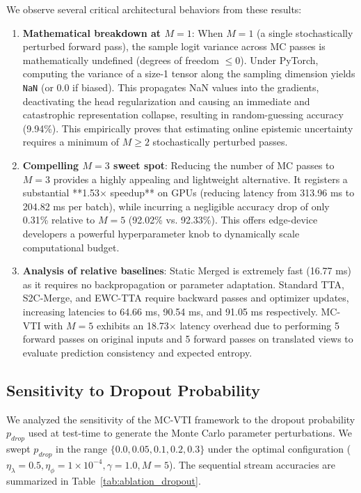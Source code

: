 \documentclass{article}
\theoremstyle{plain}
\theoremstyle{definition}
\theoremstyle{remark}
\begin{document}
We observe several critical architectural behaviors from these results:
\begin{enumerate}
  \item \textbf{Mathematical breakdown at $M=1$}: When $M=1$ (a single stochastically perturbed forward pass), the sample logit variance across MC passes is mathematically undefined (degrees of freedom $\leq 0$). Under PyTorch, computing the variance of a size-1 tensor along the sampling dimension yields \texttt{NaN} (or $0.0$ if biased). This propagates NaN values into the gradients, deactivating the head regularization and causing an immediate and catastrophic representation collapse, resulting in random-guessing accuracy (9.94\%). This empirically proves that estimating online epistemic uncertainty requires a minimum of $M \geq 2$ stochastically perturbed passes.
  \item \textbf{Compelling $M=3$ sweet spot}: Reducing the number of MC passes to $M=3$ provides a highly appealing and lightweight alternative. It registers a substantial **1.53$\times$ speedup** on GPUs (reducing latency from 313.96 ms to 204.82 ms per batch), while incurring a negligible accuracy drop of only 0.31\% relative to $M=5$ (92.02\% vs. 92.33\%). This offers edge-device developers a powerful hyperparameter knob to dynamically scale computational budget.
  \item \textbf{Analysis of relative baselines}: Static Merged is extremely fast (16.77 ms) as it requires no backpropagation or parameter adaptation. Standard TTA, S2C-Merge, and EWC-TTA require backward passes and optimizer updates, increasing latencies to 64.66 ms, 90.54 ms, and 91.05 ms respectively. MC-VTI with $M=5$ exhibits an 18.73$\times$ latency overhead due to performing 5 forward passes on original inputs and 5 forward passes on translated views to evaluate prediction consistency and expected entropy.
\end{enumerate}

\subsection{Sensitivity to Dropout Probability}
We analyzed the sensitivity of the MC-VTI framework to the dropout probability $p_{drop}$ used at test-time to generate the Monte Carlo parameter perturbations. We swept $p_{drop}$ in the range $\{0.0, 0.05, 0.1, 0.2, 0.3\}$ under the optimal configuration ($\eta_\lambda=0.5, \eta_\phi=1\times 10^{-4}, \gamma=1.0, M=5$). The sequential stream accuracies are summarized in Table~\ref{tab:ablation_dropout}.
\end{document}
